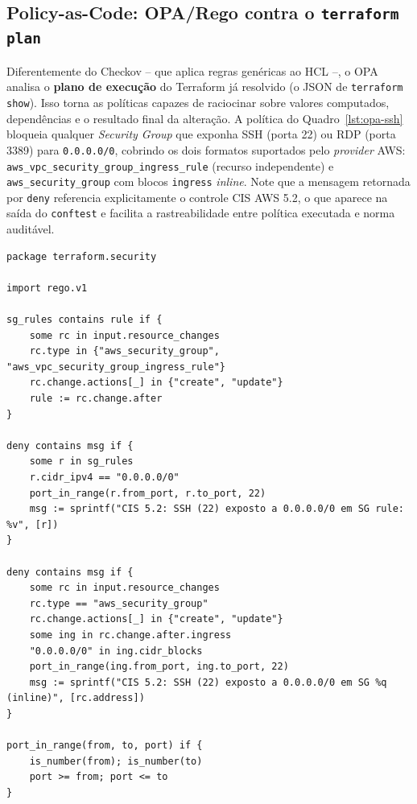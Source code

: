 \subsection{Policy-as-Code: OPA/Rego contra o \texttt{terraform plan}}

Diferentemente do Checkov -- que aplica regras genéricas ao HCL --, o OPA analisa o \textbf{plano de execução} do Terraform já resolvido (o JSON de \texttt{terraform show}). Isso torna as políticas capazes de raciocinar sobre valores computados, dependências e o resultado final da alteração. A política do Quadro~\ref{lst:opa-ssh} bloqueia qualquer \textit{Security Group} que exponha SSH (porta 22) ou RDP (porta 3389) para \texttt{0.0.0.0/0}, cobrindo os dois formatos suportados pelo \textit{provider} AWS: \texttt{aws\_vpc\_security\_group\_ingress\_rule} (recurso independente) e \texttt{aws\_security\_group} com blocos \texttt{ingress} \textit{inline}. Note que a mensagem retornada por \texttt{deny} referencia explicitamente o controle CIS AWS 5.2, o que aparece na saída do \texttt{conftest} e facilita a rastreabilidade entre política executada e norma auditável.

\begin{lstlisting}[language=Rego,caption={Política OPA/Rego \texttt{deny\_public\_ssh.rego} (PoC AWS): bloqueio de SSH e RDP expostos à Internet, atendendo ao CIS AWS 5.2.},label={lst:opa-ssh}]
package terraform.security

import rego.v1

sg_rules contains rule if {
    some rc in input.resource_changes
    rc.type in {"aws_security_group", "aws_vpc_security_group_ingress_rule"}
    rc.change.actions[_] in {"create", "update"}
    rule := rc.change.after
}

deny contains msg if {
    some r in sg_rules
    r.cidr_ipv4 == "0.0.0.0/0"
    port_in_range(r.from_port, r.to_port, 22)
    msg := sprintf("CIS 5.2: SSH (22) exposto a 0.0.0.0/0 em SG rule: %v", [r])
}

deny contains msg if {
    some rc in input.resource_changes
    rc.type == "aws_security_group"
    rc.change.actions[_] in {"create", "update"}
    some ing in rc.change.after.ingress
    "0.0.0.0/0" in ing.cidr_blocks
    port_in_range(ing.from_port, ing.to_port, 22)
    msg := sprintf("CIS 5.2: SSH (22) exposto a 0.0.0.0/0 em SG %q (inline)", [rc.address])
}

port_in_range(from, to, port) if {
    is_number(from); is_number(to)
    port >= from; port <= to
}
\end{lstlisting}

